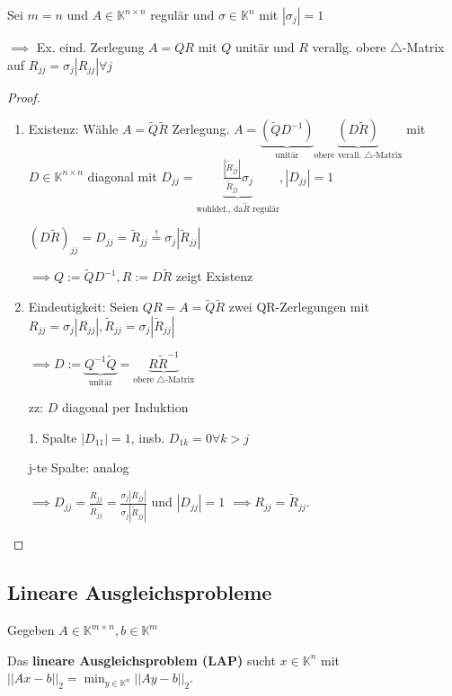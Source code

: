 \begin{theorem}
	Sei $m=n$ und $A \in \mathbb{K}^{n\times n}$ regulär und $\sigma \in \mathbb{K}^n$ mit $|\sigma_j|=1$
	
	$\implies$ Ex. eind. Zerlegung $A=QR$ mit $Q$ unitär und $R$ verallg. obere $\triangle$-Matrix auf $R_{jj} = \sigma_j |R_{jj}| \forall j$
\end{theorem}

\begin{proof}
	\begin{enumerate}
		\item Existenz: Wähle $A = \tilde{Q} \tilde{R}$ Zerlegung. $A = \underbrace{(\tilde{Q}D^{-1})}_{\text{unitär}}\underbrace{(D\tilde{R})}_{\text{obere verall. }\triangle\text{-Matrix}}$ mit $D \in \mathbb{K}^{n\times n}$ diagonal mit $D_{jj} = \underbrace{\frac{|\tilde{R}_{jj}|}{\tilde{R}_{jj}}\sigma_j}_{\text{wohldef., da} \tilde{R} \text{ regulär}}, |D_{jj}| = 1$
		
		$(D\tilde{R})_{jj} = D_{jj} = \tilde{R}_{jj} \overset{!}{=} \sigma_j |\tilde{R}_{jj}|$
		
		$\implies Q:= \tilde{Q}D^{-1}, R := D\tilde{R}$ zeigt Existenz
		
		\item Eindeutigkeit: Seien $QR=A=\tilde{Q}\tilde{R}$ zwei QR-Zerlegungen mit $R_{jj} = \sigma_j |R_{jj}|, \tilde{R}_{jj} = \sigma_j |\tilde{R}_{jj}|$
		
		$\implies D := \underbrace{Q^{-1}\tilde{Q}}_{\text{unitär}} = \underbrace{R\tilde{R}^{-1}}_{\text{obere }\triangle\text{-Matrix}}$
		
		zz: $D$ diagonal per Induktion
		
		1. Spalte $|D_{11}| = 1$, insb. $D_{1k} = 0 \forall k > j$
		
		j-te Spalte: analog
		
		$\implies D_{jj} = \frac{R_{jj}}{\tilde{R}_{jj}} = \frac{\sigma_j |R_{jj}|}{\sigma_j |\tilde{R}_{jj}|}$ und $|D_{jj}| = 1$ $\implies R_{jj} = \tilde{R}_{jj}$.
	\end{enumerate}
\end{proof}

\subsection{Lineare Ausgleichsprobleme}

Gegeben $A \in \mathbb{K}^{m\times n}, b \in \mathbb{K}^m$

Das \textbf{lineare Ausgleichsproblem (LAP)} sucht $x \in \mathbb{K}^n$ mit $||Ax-b||_2 = \min_{y \in \mathbb{K}^n} ||Ay-b||_2$.

